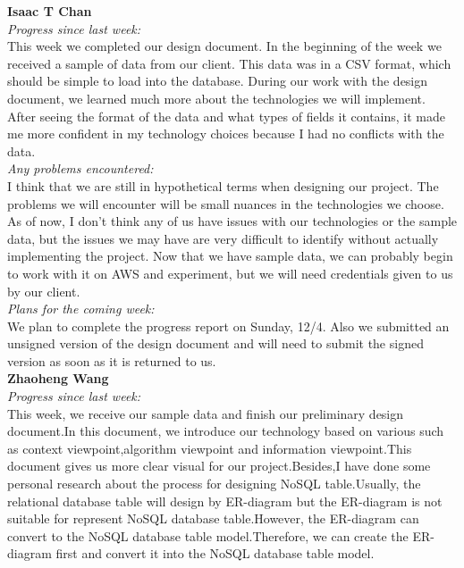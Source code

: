 \noindent\textbf{Isaac T Chan}\\
\noindent\textit{Progress since last week:}\\
This week we completed our design document. In the beginning of the week we received a sample of data from our client. This data was in a CSV format, which should be simple to load into the database. During our work with the design document, we learned much more about the technologies we will implement. After seeing the format of the data and what types of fields it contains, it made me more confident in my technology choices because I had no conflicts with the data.\\

\noindent\textit{Any problems encountered:}\\
I think that we are still in hypothetical terms when designing our project. The problems we will encounter will be small nuances in the technologies we choose. As of now, I don't think any of us have issues with our technologies or the sample data, but the issues we may have are very difficult to identify without actually implementing the project. Now that we have sample data, we can probably begin to work with it on AWS and experiment, but we will need credentials given to us by our client.\\

\noindent\textit{Plans for the coming week:}\\
We plan to complete the progress report on Sunday, 12/4. Also we submitted an unsigned version of the design document and will need to submit the signed version as soon as it is returned to us.\\

\noindent\textbf{Zhaoheng Wang}\\
\noindent\textit{Progress since last week:}\\
This week, we receive our sample data and finish our preliminary design document.In this document, we introduce our technology based on various such as context viewpoint,algorithm viewpoint and information viewpoint.This document gives us more clear visual for our project.Besides,I have done some personal research about the process for designing NoSQL table.Usually, the relational database table will design by ER-diagram but the ER-diagram is not suitable for represent NoSQL database table.However, the ER-diagram can convert to the NoSQL database table model.Therefore, we can create the ER-diagram first and convert it into the NoSQL database table model.\\

